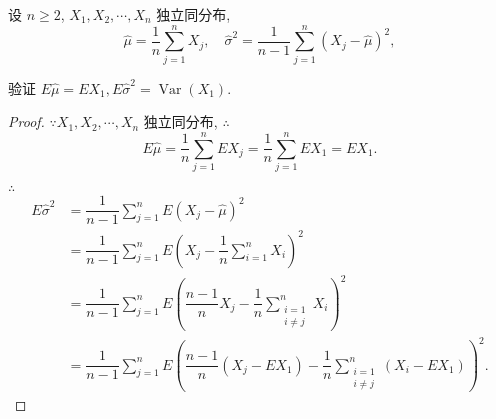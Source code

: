 \documentclass[color=black,device=normal,lang=cn]{elegantnote}
\numberwithin{equation}{section}
\theoremstyle{plain}
\numberwithin{exercise}{exsection}
\begin{document}
\addtocounter{exercise}{2}
\begin{exercise}%
    设 $n\geq 2$, $X_1,X_2,\cdots,X_n$ 独立同分布,
    \[\hat{\mu}=\dfrac{1}{n}\sum\limits_{j=1}^nX_j,\quad\hat{\sigma}^2=\dfrac{1}{n-1}\sum\limits_{j=1}^n(X_j-\hat{\mu})^2,\]

    验证 $E\hat{\mu}=EX_1,E\hat{\sigma}^2=\operatorname{Var}(X_1)$.
\end{exercise}
\begin{proof}
    $\because X_1,X_2,\cdots,X_n$ 独立同分布, $\therefore$
    \[E\hat{\mu}=\dfrac{1}{n}\sum\limits_{j=1}^nEX_j=\dfrac{1}{n}\sum\limits_{j=1}^nEX_1=EX_1.\]

    $\therefore$
    \begin{align*}
        E\hat{\sigma}^2 & =\dfrac{1}{n-1}\sum\limits_{j=1}^nE(X_j-\hat{\mu})^2 \\
        & =\dfrac{1}{n-1}\sum\limits_{j=1}^nE\left(X_j-\dfrac{1}{n}\sum\limits_{i=1}^nX_i\right)^2 \\
        & =\dfrac{1}{n-1}\sum\limits_{j=1}^nE\left(\dfrac{n-1}{n}X_j-\dfrac{1}{n}\sum\limits_{\substack{i=1\\i\neq j}}^nX_i\right)^2 \\
        & =\dfrac{1}{n-1}\sum\limits_{j=1}^nE\left(\dfrac{n-1}{n}(X_j-EX_1)-\dfrac{1}{n}\sum\limits_{\substack{i=1\\i\neq j}}^n(X_i-EX_1)\right)^2.
    \end{align*}


\end{proof}
\end{document}
